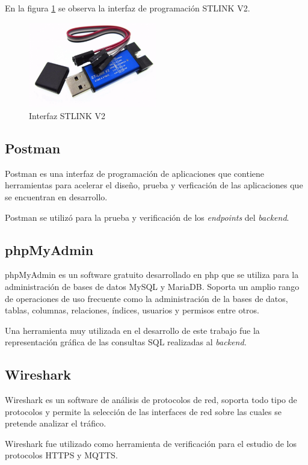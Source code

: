 En la figura \ref{fig:STLINK} se observa la interfaz de programación STLINK V2.

 \begin{figure}[htbp]
	\centering
	\includegraphics[width=0.5\textwidth]{./Figures/STLINK.png}
	\caption{Interfaz STLINK V2}
	\label{fig:STLINK}
\end{figure} 

\subsection{Postman}
Postman es una interfaz de programación de aplicaciones que contiene herramientas para acelerar el diseño, prueba y verficación de las aplicaciones que se encuentran en desarrollo\citep{post}.

Postman se utilizó para la prueba y verificación de los \textit{endpoints} del \textit{backend}.

\subsection{phpMyAdmin}
phpMyAdmin es un software gratuito desarrollado en php que se utiliza para la administración de bases de datos MySQL y MariaDB. Soporta un amplio rango de operaciones de uso frecuente como la administración de la bases de datos, tablas, columnas, relaciones, índices, usuarios y permisos entre otros\citep{php}.

Una herramienta muy utilizada en el desarrollo de este trabajo fue la representación gráfica de las consultas SQL realizadas al \textit{backend.}

\subsection{Wireshark}

Wireshark es un software de análisis de protocolos de red, soporta todo tipo de protocolos y permite la selección de las interfaces de red sobre las cuales se pretende analizar el tráfico\citep{wire}. 

Wireshark fue utilizado como herramienta de verificación para el estudio de los protocolos HTTPS y MQTTS.


